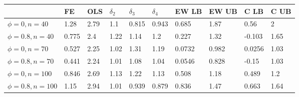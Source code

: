 \begin{tabular}{llllllllll}
& FE & OLS & $\delta_2$ & $\delta_3$ & $\delta_4$ & EW LB & EW UB & C LB & C UB \\ 
\hline 
$\phi=0,n=40$ & 1.28 & 2.79 & 1.1 & 0.815 & 0.943 & 0.685 & 1.87 & 0.56 & 2 \\ 
$\phi=0.8,n=40$ & 0.775 & 2.4 & 1.22 & 1.14 & 1.2 & 0.227 & 1.32 & -0.103 & 1.65 \\ 
$\phi=0,n=70$ & 0.527 & 2.25 & 1.02 & 1.31 & 1.19 & 0.0732 & 0.982 & 0.0256 & 1.03 \\ 
$\phi=0.8,n=70$ & 0.441 & 2.24 & 1.01 & 1.08 & 1.04 & 0.0546 & 0.828 & -0.15 & 1.03 \\ 
$\phi=0,n=100$ & 0.846 & 2.69 & 1.13 & 1.22 & 1.13 & 0.508 & 1.18 & 0.489 & 1.2 \\ 
$\phi=0.8,n=100$ & 1.15 & 2.94 & 1.01 & 0.939 & 0.879 & 0.836 & 1.47 & 0.663 & 1.64 \\ 
\hline 
\end{tabular}